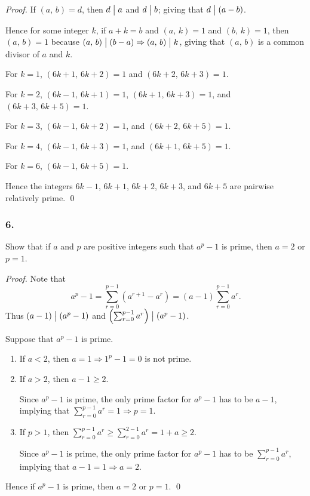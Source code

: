 \begin{proof}
    If $\left(a,\,b\right)=d$, then $d \bigm| a$ and $d \bigm| b$;
    giving that $d \bigm| \left(a-b\right)$.

    Hence for some integer $k$, if $a+k=b$ and $\left(a,\,k\right)=1$
    and $\left(b,\,k\right)=1$,
    then $\left(a,\,b\right)=1$ because $\left(a,\,b\right) \bigm| \left(b-a\right) \Rightarrow \left(a,\,b\right) \bigm| k$,
    giving that $\left(a,\,b\right)$ is a common divisor of $a$ and $k$.

    For $k=1$,
    $\left(6k+1,\,6k+2\right)=1$
    and $\left(6k+2,\,6k+3\right)=1$.

    For $k=2$,
    $\left(6k-1,\,6k+1\right)=1$,
    $\left(6k+1,\,6k+3\right)=1$,
    and $\left(6k+3,\,6k+5\right)=1$.

    For $k=3$,
    $\left(6k-1,\,6k+2\right)=1$,
    and $\left(6k+2,\,6k+5\right)=1$.

    For $k=4$,
    $\left(6k-1,\,6k+3\right)=1$,
    and $\left(6k+1,\,6k+5\right)=1$.

    For $k=6$,
    $\left(6k-1,\,6k+5\right)=1$.

    Hence the integers
    $6k-1$, $6k+1$, $6k+2$, $6k+3$, and $6k+5$ are pairwise relatively prime. \qed
\end{proof}

\subsubsection{6.} Show that if $a$ and $p$ are positive integers such that $a^p-1$
is prime, then $a=2$ or $p=1$.

\begin{proof}
    Note that
    \[
        a^p-1=\sum_{r=0}^{p-1}\left(a^{r+1}-a^r\right)=\left(a-1\right)\sum_{r=0}^{p-1} a^r.
    \]
    Thus $\left(a-1\right) \bigm| \left(a^p-1\right)$ and $\left(\sum_{r=0}^{p-1} a^r\right) \bigm| \left(a^p-1\right)$.

    Suppose that $a^p-1$ is prime.
    \begin{enumerate}
        \item If $a < 2$, then $a=1 \Rightarrow 1^p-1=0$ is not prime.
        
        \item If $a > 2$, then $a-1 \geq 2$.
        
        Since $a^p-1$ is prime, the only prime
        factor for $a^p-1$ has to be $a-1$, implying that $\sum_{r=0}^{p-1} a^r=1 \Rightarrow p=1$.
        
        \item If $p > 1$, then $\sum_{r=0}^{p-1} a^r \geq \sum_{r=0}^{2-1} a^r= 1+a \geq 2$.
        
        Since $a^p-1$ is prime, the only prime factor for $a^p-1$ has to be $\sum_{r=0}^{p-1} a^r$,
        implying that $a-1=1 \Rightarrow a=2$.
    \end{enumerate}
    Hence if $a^p-1$ is prime, then $a=2$ or $p=1$. \qed
\end{proof}

